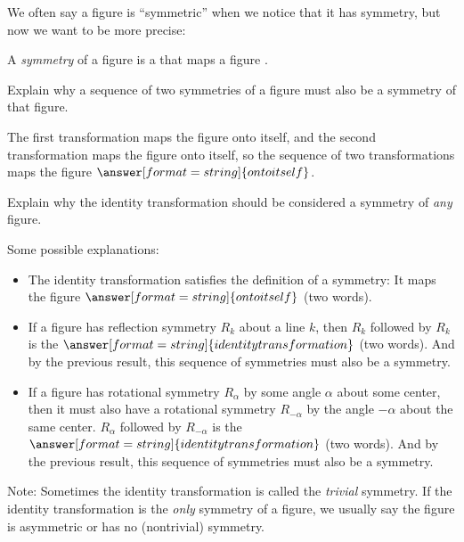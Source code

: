 \documentclass[nooutcomes]{ximera}
\begin{document}
\begin{question}
We often say a figure is ``symmetric'' when we notice that it has symmetry, but now we want to be more precise:  

A \emph{symmetry} of a figure is a
that maps a figure 
.  
\end{question}

\begin{question}
Explain why a sequence of two symmetries of a figure must also be a symmetry of that figure.  
\begin{freeResponse}
\end{freeResponse}
\begin{feedback}
The first transformation maps the figure onto itself, and the second transformation maps the figure onto itself, so the sequence of two transformations maps the figure $\answer[format=string]{onto itself}$.  
\end{feedback}
\end{question}

\begin{question}
Explain why the identity transformation should be considered a symmetry of \emph{any} figure.   

\begin{freeResponse}
\end{freeResponse}
\begin{hint}
Some possible explanations: 
\begin{itemize}
\item The identity transformation satisfies the definition of a symmetry: It maps the figure $\answer[format=string]{onto itself}$ (two words). 
\item If a figure has reflection symmetry $R_k$ about a line $k$, then $R_k$ followed by $R_k$ is the $\answer[format=string]{identity transformation}$ (two words).  And by the previous result, this sequence of symmetries must also be a symmetry.  
\item If a figure has rotational symmetry $R_\alpha$ by some angle $\alpha$ about some center, then it must also have a rotational symmetry $R_{-\alpha}$ by the angle $-\alpha$ about the same center.  $R_\alpha$ followed by $R_{-\alpha}$ is the $\answer[format=string]{identity transformation}$ (two words).  And by the previous result, this sequence of symmetries must also be a symmetry.  
\end{itemize}
\end{hint}
\begin{feedback}[correct]
Note: Sometimes the identity transformation is called the \emph{trivial} symmetry.  If the identity transformation is the \emph{only} symmetry of a figure, we usually say the figure is asymmetric or has no (nontrivial) symmetry.  
\end{feedback}
\end{question}
\end{document}
